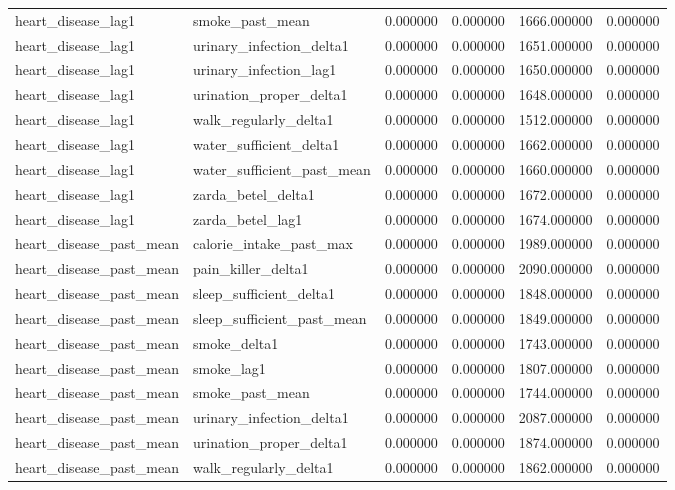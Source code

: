 \begin{longtable}{llrrrr}
heart\_disease\_lag1 & smoke\_past\_mean & 0.000000 & 0.000000 & 1666.000000 & 0.000000 \\
heart\_disease\_lag1 & urinary\_infection\_delta1 & 0.000000 & 0.000000 & 1651.000000 & 0.000000 \\
heart\_disease\_lag1 & urinary\_infection\_lag1 & 0.000000 & 0.000000 & 1650.000000 & 0.000000 \\
heart\_disease\_lag1 & urination\_proper\_delta1 & 0.000000 & 0.000000 & 1648.000000 & 0.000000 \\
heart\_disease\_lag1 & walk\_regularly\_delta1 & 0.000000 & 0.000000 & 1512.000000 & 0.000000 \\
heart\_disease\_lag1 & water\_sufficient\_delta1 & 0.000000 & 0.000000 & 1662.000000 & 0.000000 \\
heart\_disease\_lag1 & water\_sufficient\_past\_mean & 0.000000 & 0.000000 & 1660.000000 & 0.000000 \\
heart\_disease\_lag1 & zarda\_betel\_delta1 & 0.000000 & 0.000000 & 1672.000000 & 0.000000 \\
heart\_disease\_lag1 & zarda\_betel\_lag1 & 0.000000 & 0.000000 & 1674.000000 & 0.000000 \\
heart\_disease\_past\_mean & calorie\_intake\_past\_max & 0.000000 & 0.000000 & 1989.000000 & 0.000000 \\
heart\_disease\_past\_mean & pain\_killer\_delta1 & 0.000000 & 0.000000 & 2090.000000 & 0.000000 \\
heart\_disease\_past\_mean & sleep\_sufficient\_delta1 & 0.000000 & 0.000000 & 1848.000000 & 0.000000 \\
heart\_disease\_past\_mean & sleep\_sufficient\_past\_mean & 0.000000 & 0.000000 & 1849.000000 & 0.000000 \\
heart\_disease\_past\_mean & smoke\_delta1 & 0.000000 & 0.000000 & 1743.000000 & 0.000000 \\
heart\_disease\_past\_mean & smoke\_lag1 & 0.000000 & 0.000000 & 1807.000000 & 0.000000 \\
heart\_disease\_past\_mean & smoke\_past\_mean & 0.000000 & 0.000000 & 1744.000000 & 0.000000 \\
heart\_disease\_past\_mean & urinary\_infection\_delta1 & 0.000000 & 0.000000 & 2087.000000 & 0.000000 \\
heart\_disease\_past\_mean & urination\_proper\_delta1 & 0.000000 & 0.000000 & 1874.000000 & 0.000000 \\
heart\_disease\_past\_mean & walk\_regularly\_delta1 & 0.000000 & 0.000000 & 1862.000000 & 0.000000 \\

\end{longtable}
